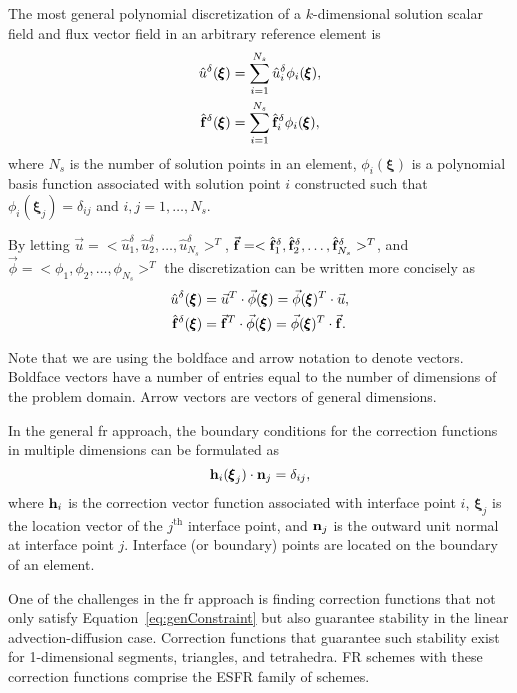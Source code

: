 The most general polynomial discretization of a $k$-dimensional solution scalar field and flux vector field in an arbitrary reference element is
\begin{align}
\label{eqn:general_u}
\hat{u}^\delta({\pmb \xi}) &= \sum_{i=1}^{N_s} \hat{u}_i^\delta {\phi}_i({\pmb \xi}),\\
\hat{\bf f}^\delta({\pmb \xi}) &= \sum_{i=1}^{N_s} \hat{\bf f}_i^\delta {\phi}_i({\pmb \xi}),
\end{align}
where $N_s$ is the number of solution points in an element, ${\phi}_i({\pmb \xi})$ is a polynomial basis function associated with solution point $i$ constructed such that ${\phi}_i({\pmb \xi}_j) = \delta_{ij}$ and $i,j = 1,\dots,N_s$.

By letting $\vec{u} = <\hat{u}_1^\delta, \hat{u}_2^\delta,\dots,\hat{u}_{N_s}^\delta>^T $, $\vec{\bf f} = <\hat{\bf f}_1^\delta, \hat{\bf f}_2^\delta,\dots,\hat{\bf f}_{N_s}^\delta>^T $, and $\vec{\phi} = <\phi_1,\phi_2,\dots,\phi_{N_s}>^T$ the discretization can be written more concisely as
\begin{equation}
\begin{split}
\hat{u}^\delta({\pmb \xi}) &= \vec{u}^T \cdot \vec{\phi}({\pmb \xi}) =  \vec{\phi}({\pmb \xi})^T\cdot \vec{u},\\
\hat{\bf f}^\delta({\pmb \xi}) &= \vec{\bf f}^T \cdot \vec{\phi}({\pmb \xi}) = \vec{\phi}({\pmb \xi})^T \cdot \vec{\bf f}.
\end{split}
\end{equation}

Note that we are using the boldface and arrow notation to denote vectors. Boldface vectors have a number of entries equal to the number of dimensions of the problem domain. Arrow vectors are vectors of general dimensions.

In the general \gls{fr} approach, the boundary conditions for the correction functions in multiple dimensions can be formulated as
\begin{equation}\label{eq:genConstraint}
{\bf{h}}_i( {\pmb \xi}_j)\cdot {\bf{n}}_j = \delta_{ij},
\end{equation}
where ${\bf{h}}_i$ is the correction vector function associated with interface point $i$, ${\pmb \xi}_j$ is the location vector of the $j^\text{th}$ interface point, and ${\bf{n}}_j$ is the outward unit normal at interface point $j$. Interface (or boundary) points are located on the boundary of an element.

One of the challenges in the \gls{fr} approach is finding correction functions that not only satisfy Equation~\eqref{eq:genConstraint} but also guarantee stability in the linear advection-diffusion case. Correction functions that guarantee such stability exist for 1-dimensional segments\cite{vincent2011new}, triangles\cite{castonguay2012new,williams2013tri}, and tetrahedra\cite{williams2013tet}. FR schemes with these correction functions comprise the ESFR family of schemes.

